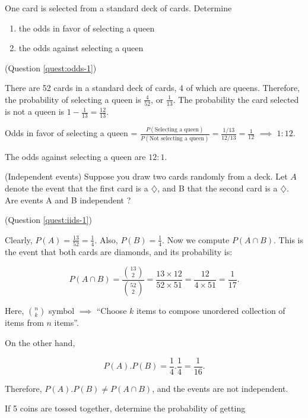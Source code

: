 \documentclass[
  answers,addpoints,12pt]{exam}
\providecommand{\tightlist}{%
  \setlength{\itemsep}{0pt}\setlength{\parskip}{0pt}}
\newcommand{\bsolution}{\begin{solution}}
\newcommand{\esolution}{\end{solution}}
\begin{document}
One card is selected from a standard deck of cards. Determine

\begin{enumerate}
\def\labelenumi{\alph{enumi}.}
\tightlist
\item
  the odds in favor of selecting a queen
\item
  the odds against selecting a queen
\end{enumerate}

\bsolution (Question \ref{quest:odds-1})

There are 52 cards in a standard deck of cards, 4 of which are queens. Therefore, the probability of selecting a queen is \(\frac{4}{52}\), or \(\frac{1}{13}\). The probability the card selected is not a queen is \(1-\frac{1}{13} = \frac{12}{13}\).

Odds in favor of selecting a queen = \(\frac{P(\text{Selecting a queen})}{P(\text{Not selecting a queen})} = \frac{1/13}{12/13} = \frac{1}{12}\) \(\implies\) \(1:12\).

The odds against selecting a queen are \(12:1\).

\esolution

\question \label{quest:iids-1}

(Independent events) Suppose you draw two cards randomly from a deck. Let \(A\) denote the event that the first card is a \(\diamondsuit\), and B that the second card is a \(\diamondsuit\). Are events A and B independent ?

\bsolution (Question \ref{quest:iids-1})

Clearly, \(P(A) = \frac{13}{52} = \frac{1}{4}\). Also, \(P(B)= \frac{1}{4}\). Now we compute \(P(A\cap B)\). This is the event that both cards are diamonds, and its probability is:

\[
P(A \cap B) = \frac{{13\choose 2}}{{52 \choose2}} = \frac{13\times 12}{52\times 51} = \frac{12}{4\times 51} = \frac{1}{17}.
\]

Here, \(n \choose k\) symbol \(\implies\) ``Choose \(k\) items to compose unordered collection of items from \(n\) items''.

On the other hand,

\[
P(A).P(B) = \frac{1}{4}.\frac{1}{4} = \frac{1}{16}.
\]

Therefore, \(P(A). P(B) \neq P(A\cap B)\), and the events are not independent.

\esolution

\question \label{quest:prob-1}

If 5 coins are tossed together, determine the probability of getting
\end{document}
